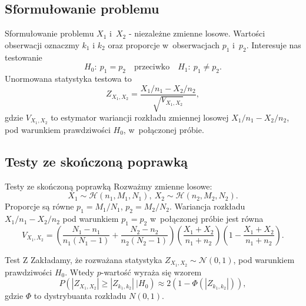 \documentclass{beamer}
\newcommand{\1}[1]{\mathds{1}\left(#1\right)}
\begin{document}
\subsection{Sformułowanie problemu}
\begin{frame}{Sformułowanie problemu}
$X_1$ i~$X_2$ - niezależne zmienne losowe. Wartości obserwacji oznaczmy $k_1$ i $k_2$ oraz proporcje w~obserwacjach $p_1$ i~$p_2$. Interesuje nas testowanie
\begin{equation}
H_0{:}\ p_1=p_2\quad \text{przeciwko} \quad H_1{:}\ p_1\neq p_2.
\end{equation}
Unormowana statystyka testowa to
\begin{equation}
Z_{X_1,X_2} = \frac{X_1/n_1-X_2/n_2}{\sqrt{V_{X_1,X_2}}},
\end{equation}
gdzie $V_{X_1,X_2}$ to estymator wariancji rozkładu zmiennej losowej $X_1/n_1-X_2/n_2$, pod warunkiem prawdziwości $H_0$, w~połączonej próbie.
\end{frame}

\subsection{Testy ze skończoną poprawką}
\begin{frame}{Testy ze skończoną poprawką}
Rozważmy zmienne losowe:
\begin{equation}
X_1\sim \mathcal{H}(n_1,M_1,N_1),\ X_2\sim \mathcal{H}(n_2,M_2,N_2).
\end{equation}
Proporcje są równe $p_1=M_1/N_1$, $p_2=M_2/N_2$. Wariancja rozkładu $X_1/n_1-X_2/n_2$ pod warunkiem $p_1=p_2$ w~połączonej próbie jest równa
\begin{equation}
V_{X_1,X_2} = \left(\frac{N_1-n_1}{n_1(N_1-1)}+\frac{N_2-n_2}{n_2(N_2-1)}\right)\left(\frac{X_1+X_2}{n_1+n_2}\right)\left(1-\frac{X_1+X_2}{n_1+n_2}\right).
\end{equation}
\end{frame}


\begin{frame}{Test Z}
Zakładamy, że rozważana statystyka $Z_{X_1,X_2}\sim\mathcal{N}(0,1)$, pod warunkiem prawdziwości $H_0$. Wtedy $p$-wartość wyraża się wzorem
\begin{equation}
P(|Z_{X_1,X_2}|\geq|Z_{k_1,k_2}|\ |H_0) \approx 2(1-\Phi(|Z_{k_1,k_2}|)),
\end{equation}
gdzie $\Phi$ to dystrybuanta rozkładu $N(0,1)$.
\end{frame}
\end{document}
